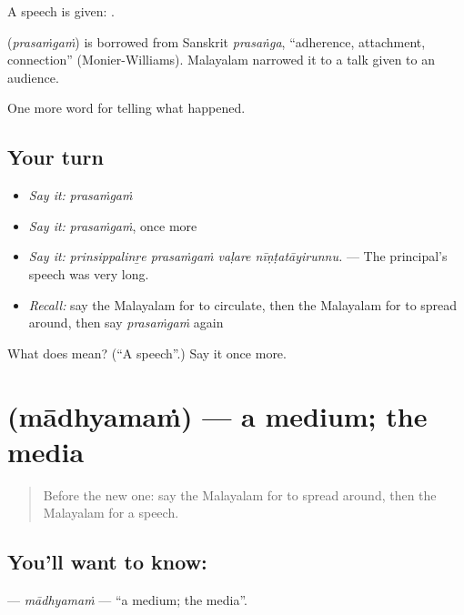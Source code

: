 A speech is given:  .

\begin{cousinweb}
\textbf{} (\emph{prasaṁgaṁ}) is borrowed from Sanskrit \emph{prasaṅga}, \textquotedblleft{}adherence, attachment, connection\textquotedblright{} (Monier-Williams). Malayalam narrowed it to a talk given to an audience.
\end{cousinweb}

\begin{grammarlens}[title={What you've built}]
One more word for telling what happened.
\end{grammarlens}

\subsection*{Your turn}
\begin{itemize}
\raggedright
  \item \emph{Say it:} \emph{prasaṁgaṁ}
  \item \emph{Say it:} \emph{prasaṁgaṁ}, once more
  \item \emph{Say it:} \emph{prinsippalinṟe prasaṁgaṁ vaḷare nīṇṭatāyirunnu.} — The principal's speech was very long.
  \item \emph{Recall:} say the Malayalam for to circulate, then the Malayalam for to spread around, then say \emph{prasaṁgaṁ} again
\end{itemize}

\begin{tcolorbox}[breakable,colback=teal!4,colframe=teal!35!black,title={Before you move on}]
What does  mean? (\textquotedblleft{}A speech\textquotedblright{}.) Say it once more.
\end{tcolorbox}
\section[\texorpdfstring{\ml{മാധ്യമം} (mādhyamaṁ)}{മാധ്യമം (mādhyamaṁ)}]{ (mādhyamaṁ) — a medium; the media}

\label{lesson:ML-C354-madhyamam}



\begin{quote}
Before the new one: say the Malayalam for to spread around, then the Malayalam for a speech.
\end{quote}

\subsection*{You'll want to know: }
\textbf{} — \emph{mādhyamaṁ} — \textquotedblleft{}a medium; the media\textquotedblright{}.


